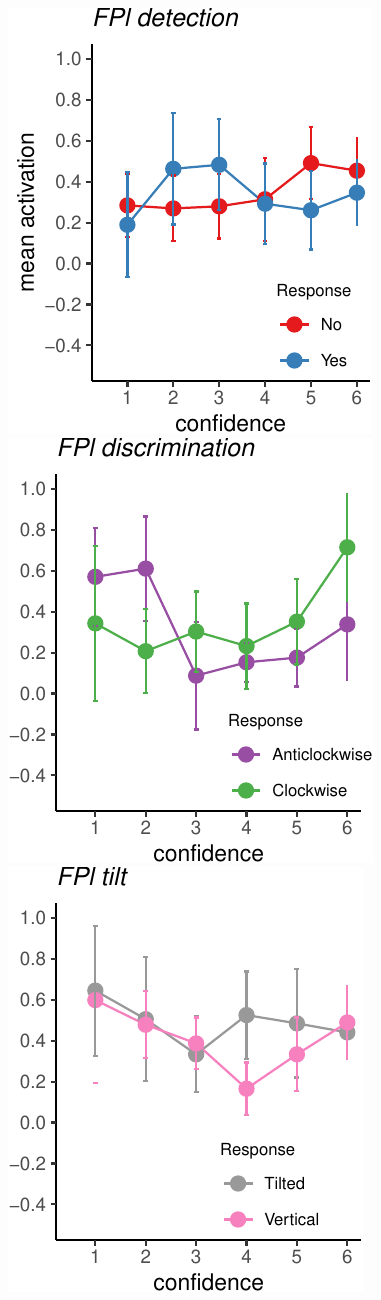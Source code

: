 \documentclass[
]{article}
\begin{document}
\includegraphics{Chudi-Thesis-2020_files/figure-latex/unnamed-chunk-11-1.pdf}
\includegraphics{Chudi-Thesis-2020_files/figure-latex/unnamed-chunk-11-2.pdf}
\includegraphics{Chudi-Thesis-2020_files/figure-latex/unnamed-chunk-11-3.pdf}
~
\end{document}
